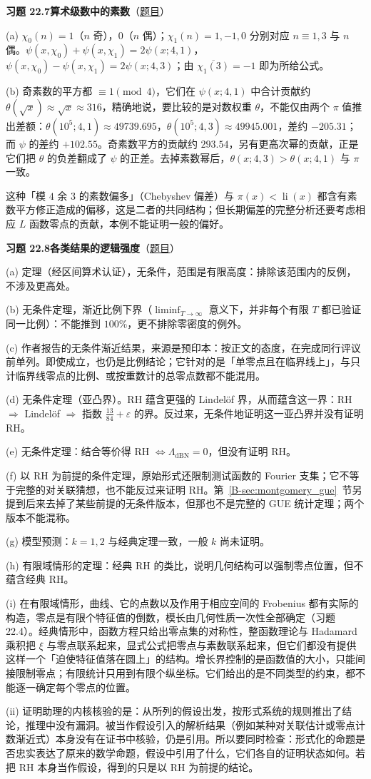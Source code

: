 \documentclass[11pt,a4paper]{article}
\DeclareMathOperator{\li}{li}
\newcommand{\bref}[1]{\ref*{B-#1}}
\newcommand{\Sol}[2]{%
  \par\addvspace{1.2em}\noindent
  \hypertarget{s:#1}{}\textbf{习题 #1\quad #2}\hfill{\small（\hyperlink{q:#1}{题目}）}\par
  \nopagebreak\smallskip}
\begin{document}
\Sol{22.7}{算术级数中的素数}
(a) $\chi_0(n)=1$（$n$ 奇），$0$（$n$ 偶）；$\chi_1(n)=1,-1,0$ 分别对应 $n\equiv1,3$ 与 $n$ 偶。$\psi(x,\chi_0)+\psi(x,\chi_1)=2\psi(x;4,1)$，$\psi(x,\chi_0)-\psi(x,\chi_1)=2\psi(x;4,3)$；由 $\overline{\chi_1(3)}=-1$ 即为所给公式。

(b) 奇素数的平方都 $\equiv1\pmod4$，它们在 $\psi(x;4,1)$ 中合计贡献约 $\theta(\sqrt x)\approx\sqrt x\approx316$，精确地说，要比较的是对数权重 $\theta$，不能仅由两个 $\pi$ 值推出差额：$\theta(10^5;4,1)\approx49739.695$，$\theta(10^5;4,3)\approx49945.001$，差约 $-205.31$；而 $\psi$ 的差约 $+102.55$。奇素数平方的贡献约 $293.54$，另有更高次幂的贡献，正是它们把 $\theta$ 的负差翻成了 $\psi$ 的正差。去掉素数幂后，$\theta(x;4,3)>\theta(x;4,1)$ 与 $\pi$ 一致。

这种「模 $4$ 余 $3$ 的素数偏多」（Chebyshev 偏差）与 $\pi(x)<\li(x)$ 都含有素数平方修正造成的偏移，这是二者的共同结构；但长期偏差的完整分析还要考虑相应 $L$ 函数零点的贡献，本例不能证明一般的偏好。

\Sol{22.8}{各类结果的逻辑强度}
(a) 定理（经区间算术认证），无条件，范围是有限高度：排除该范围内的反例，不涉及更高处。

(b) 无条件定理，渐近比例下界（$\liminf_{T\to\infty}$ 意义下，并非每个有限 $T$ 都已验证同一比例）：不能推到 $100\%$，更不排除零密度的例外。

(c) 作者报告的无条件渐近结果，来源是预印本：按正文的态度，在完成同行评议前单列。即使成立，也仍是比例结论；它针对的是「单零点且在临界线上」，与只计临界线零点的比例、或按重数计的总零点数都不能混用。

(d) 无条件定理（亚凸界）。RH 蕴含更强的 Lindelöf 界，从而蕴含这一界：RH $\Rightarrow$ Lindelöf $\Rightarrow$ 指数 $\frac{13}{84}+\varepsilon$ 的界。反过来，无条件地证明这一亚凸界并没有证明 RH。

(e) 无条件定理：结合等价得 RH $\iff\Lambda_{\mathrm{dBN}}=0$，但没有证明 RH。

(f) 以 RH 为前提的条件定理，原始形式还限制测试函数的 Fourier 支集；它不等于完整的对关联猜想，也不能反过来证明 RH。第~\bref{sec:montgomery_gue}~节另提到后来去掉了某些前提的无条件版本，但那也不是完整的 GUE 统计定理；两个版本不能混称。

(g) 模型预测：$k=1,2$ 与经典定理一致，一般 $k$ 尚未证明。

(h) 有限域情形的定理：经典 RH 的类比，说明几何结构可以强制零点位置，但不蕴含经典 RH。

(i) 在有限域情形，曲线、它的点数以及作用于相应空间的 Frobenius 都有实际的构造，零点是有限个特征值的倒数，模长由几何性质一次性全部确定（习题 22.4）。经典情形中，函数方程只给出零点集的对称性，整函数理论与 Hadamard 乘积把 $\xi$ 与零点联系起来，显式公式把零点与素数联系起来，但它们都没有提供这样一个「迫使特征值落在圆上」的结构。增长界控制的是函数值的大小，只能间接限制零点；有限统计只用到有限个纵坐标。它们给出的是不同类型的约束，都不能逐一确定每个零点的位置。

(ii) 证明助理的内核核验的是：从所列的假设出发，按形式系统的规则推出了结论，推理中没有漏洞。被当作假设引入的解析结果（例如某种对关联估计或零点计数渐近式）本身没有在证书中核验，仍是引用。所以要同时检查：形式化的命题是否忠实表达了原来的数学命题，假设中引用了什么，它们各自的证明状态如何。若把 RH 本身当作假设，得到的只是以 RH 为前提的结论。
\end{document}
